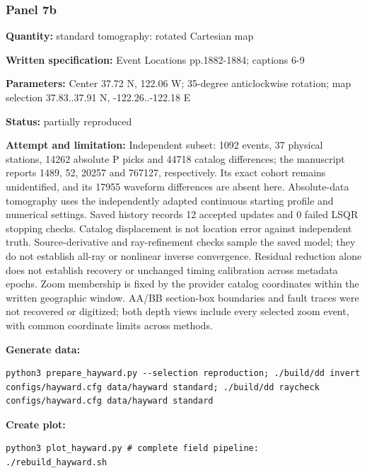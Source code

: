 \subsubsection*{Panel 7b}
\noindent\textbf{Quantity:} standard tomography: rotated Cartesian map\par
\noindent\textbf{Written specification:} Event Locations pp.1882-1884; captions 6-9\par
\noindent\textbf{Parameters:} Center 37.72 N, 122.06 W; 35-degree anticlockwise rotation; map selection 37.83..37.91 N, -122.26..-122.18 E\par
\noindent\textbf{Status:} partially reproduced\par
\noindent\textbf{Attempt and limitation:} Independent subset: 1092 events, 37 physical stations, 14262 absolute P picks and 44718 catalog differences; the manuscript reports 1489, 52, 20257 and 767127, respectively. Its exact cohort remains unidentified, and its 17955 waveform differences are absent here. Absolute-data tomography uses the independently adapted continuous starting profile and numerical settings. Saved history records 12 accepted updates and 0 failed LSQR stopping checks. Catalog displacement is not location error against independent truth. Source-derivative and ray-refinement checks sample the saved model; they do not establish all-ray or nonlinear inverse convergence. Residual reduction alone does not establish recovery or unchanged timing calibration across metadata epochs. Zoom membership is fixed by the provider catalog coordinates within the written geographic window. AA/BB section-box boundaries and fault traces were not recovered or digitized; both depth views include every selected zoom event, with common coordinate limits across methods.\par
\noindent\textbf{Generate data:}
\begin{lstlisting}
python3 prepare_hayward.py --selection reproduction; ./build/dd invert configs/hayward.cfg data/hayward standard; ./build/dd raycheck configs/hayward.cfg data/hayward standard
\end{lstlisting}
\noindent\textbf{Create plot:}
\begin{lstlisting}
python3 plot_hayward.py # complete field pipeline: ./rebuild_hayward.sh
\end{lstlisting}

